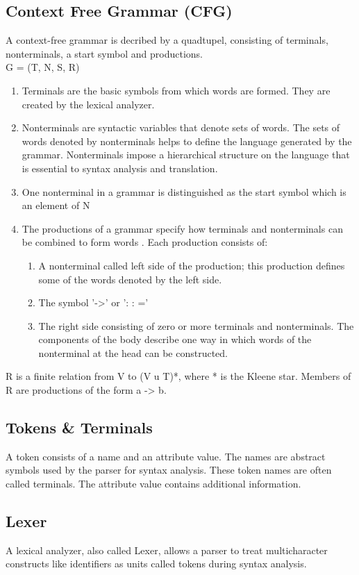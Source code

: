 \subsection{Context Free Grammar (CFG)}
A context-free grammar is decribed by a quadtupel, consisting of terminals, nonterminals, a start symbol and productions. \\
G = (T, N, S, R)\\
\begin{enumerate}
	\item Terminals are the basic symbols from which words are formed.  They are created by the lexical analyzer.
	\item Nonterminals are syntactic variables that denote sets of words. The sets of words denoted by nonterminals helps to define the language generated by the grammar. Nonterminals impose a hierarchical structure on the language that is essential to syntax analysis and translation.
	\item One nonterminal in a grammar is distinguished as the start symbol which is an element of N
	\item The productions of a grammar specify how terminals and nonterminals can be combined to form words . Each production consists of:
	\begin{enumerate}
		\item A nonterminal called left side of the production; this production defines some of the words denoted by the left side.
		\item The symbol '->'  or  ': : =' 
		\item The right side consisting of zero or more terminals and nonterminals. The components of the body describe one way in which words of the nonterminal at the head can be constructed.
	\end{enumerate}
\end{enumerate}
 R is a finite relation from V to (V u T)*, where * is the Kleene star. Members of R are productions of the form a -> b.\cite{DragonBook}


\subsection{Tokens \& Terminals}  
A token consists of a name and an attribute value. The names are abstract symbols used by the parser for syntax analysis. These token names are often called terminals. The attribute value contains additional information.\cite{DragonBook}


\subsection{Lexer}
A lexical analyzer, also called Lexer, allows a parser to treat multicharacter constructs like identifiers as units called tokens during syntax analysis.\cite{DragonBook}

